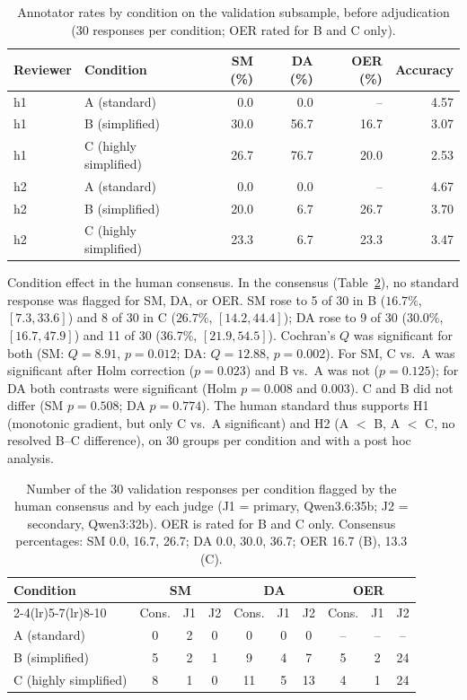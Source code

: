 \documentclass[journal,article,submit,pdftex,moreauthors]{Definitions/mdpi}
\begin{document}
\begin{table}[H]
\caption{Annotator rates by condition on the validation subsample, before adjudication (30 responses per condition; OER rated for B and C only).}
\label{tab:reviewer:rates}
\centering
\small
\begin{tabular}{llrrrr}
\toprule
Reviewer & Condition & SM (\%) & DA (\%) & OER (\%) & Accuracy \\
\midrule
h1 & A (standard) & 0.0 & 0.0 & -- & 4.57 \\
h1 & B (simplified) & 30.0 & 56.7 & 16.7 & 3.07 \\
h1 & C (highly simplified) & 26.7 & 76.7 & 20.0 & 2.53 \\
h2 & A (standard) & 0.0 & 0.0 & -- & 4.67 \\
h2 & B (simplified) & 20.0 & 6.7 & 26.7 & 3.70 \\
h2 & C (highly simplified) & 23.3 & 6.7 & 23.3 & 3.47 \\
\bottomrule
\end{tabular}
\end{table}

Condition effect in the human consensus. In the consensus (Table~\ref{tab:reviewer:consensus}), no standard response was flagged for SM, DA, or OER. SM rose to 5 of 30 in B ($16.7\%$, $[7.3, 33.6]$) and 8 of 30 in C ($26.7\%$, $[14.2, 44.4]$); DA rose to 9 of 30 ($30.0\%$, $[16.7, 47.9]$) and 11 of 30 ($36.7\%$, $[21.9, 54.5]$). Cochran's $Q$ was significant for both (SM: $Q = 8.91$, $p = 0.012$; DA: $Q = 12.88$, $p = 0.002$). For SM, C vs.\ A was significant after Holm correction ($p = 0.023$) and B vs.\ A was not ($p = 0.125$); for DA both contrasts were significant (Holm $p = 0.008$ and $0.003$). C and B did not differ (SM $p = 0.508$; DA $p = 0.774$). The human standard thus supports H1 (monotonic gradient, but only C vs.\ A significant) and H2 (A $<$ B, A $<$ C, no resolved B--C difference), on 30 groups per condition and with a post hoc analysis.

\begin{table}[H]
\caption{Number of the 30 validation responses per condition flagged by the human consensus and by each judge (J1 = primary, Qwen3.6:35b; J2 = secondary, Qwen3:32b). OER is rated for B and C only. Consensus percentages: SM 0.0, 16.7, 26.7; DA 0.0, 30.0, 36.7; OER 16.7 (B), 13.3 (C).}
\label{tab:reviewer:consensus}
\centering
\small
\begin{tabular}{lccccccccc}
\toprule
\multirow{2}{*}{Condition} & \multicolumn{3}{c}{SM} & \multicolumn{3}{c}{DA} & \multicolumn{3}{c}{OER} \\
\cmidrule(lr){2-4}\cmidrule(lr){5-7}\cmidrule(lr){8-10}
 & Cons. & J1 & J2 & Cons. & J1 & J2 & Cons. & J1 & J2 \\
\midrule
A (standard) & 0 & 2 & 0 & 0 & 0 & 0 & -- & -- & -- \\
B (simplified) & 5 & 2 & 1 & 9 & 4 & 7 & 5 & 2 & 24 \\
C (highly simplified) & 8 & 1 & 0 & 11 & 5 & 13 & 4 & 1 & 24 \\
\bottomrule
\end{tabular}
\end{table}
\end{document}
